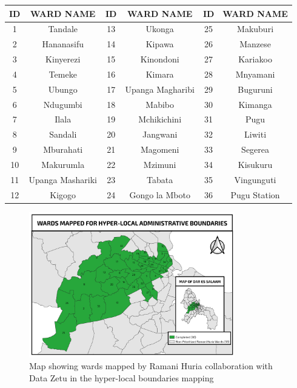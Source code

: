 \documentclass[a4paper,12pt,twoside]{article}
\begin{document}
\begin{center}
\begin{tabular}{|c|c|c|c|c|c|}
\hline
ID & WARD NAME & ID & WARD NAME & ID & WARD NAME\\
\hline
1  &  Tandale &  13 &   Ukonga &  25  &  Makuburi\\
2  &  Hananasifu &  14  &  Kipawa &  26  &  Manzese\\
3  &  Kinyerezi &  15  &  Kinondoni &  27  &  Kariakoo\\
4 &  Temeke &  16  &  Kimara &  28  &  Mnyamani\\
5  &  Ubungo &  17  &  Upanga Magharibi &  29  &  Buguruni\\
6 &   Ndugumbi &  18  &  Mabibo &  30  &  Kimanga\\
7 &   Ilala &  19  &  Mchikichini &  31  &  Pugu\\
8 &   Sandali &  20  &  Jangwani &  32  &  Liwiti\\
9  &  Mburahati &  21  &  Magomeni &  33  &  Segerea\\
10  &  Makurumla &  22  &  Mzimuni &  34  &  Kisukuru\\
11  &  Upanga Mashariki &  23  &  Tabata &  35  &  Vingunguti\\
12  &  Kigogo &  24  &  Gongo la Mboto &  36  & Pugu Station\\
 \hline
\end{tabular}
\end{center}

\begin{figure}[h]
  \color{RHgreen}\caption{Map showing wards mapped by Ramani Huria collaboration with Data Zetu in the hyper-local boundaries mapping}
  \centering
 \includegraphics[width=0.8\textwidth]{images/hyperlocal_boundary.png}
\end{figure}
\end{document}
